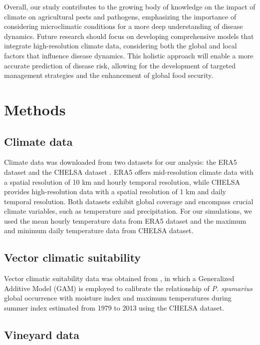 Overall, our study contributes to the growing body of knowledge on the
impact of climate on agricultural pests and pathogens, emphasizing the
importance of considering microclimatic conditions for a more deep
understanding of disease dynamics. Future research should focus on developing
comprehensive models that integrate high-resolution climate data, considering
both the global and local factors that influence disease dynamics. This
holistic approach will enable a more accurate prediction of disease risk,
allowing for the development of targeted management strategies and the
enhancement of global food security.

\section{Methods}

\subsection{Climate data}

Climate data was downloaded from two datasets for our analysis: the ERA5
dataset \cite{munoz-sabater_era5-land_2021, ERA5_dataset} and the CHELSA
dataset \cite{Karger2017, chelsa-climatologies-2021}. ERA5 offers
mid-resolution climate data with a spatial resolution of 10 km and hourly
temporal resolution, while CHELSA provides high-resolution data with a spatial
resolution of 1 km and daily temporal resolution. Both datasets exhibit global
coverage and encompass crucial climate variables, such as temperature and
precipitation. For our simulations, we used the mean hourly temperature data
from ERA5 dataset and the maximum and minimum daily temperature data from
CHELSA dataset.

\subsection{Vector climatic suitability}

Vector climatic suitability data was obtained from \cite{Godefroid2022}, in
which a Generalized Additive Model (GAM) is employed to calibrate the
relationship of \textit{P. spumarius} global occurrence with moisture index and
maximum temperatures during summer index estimated from 1979 to 2013 using the
CHELSA dataset.

\subsection{Vineyard data}

